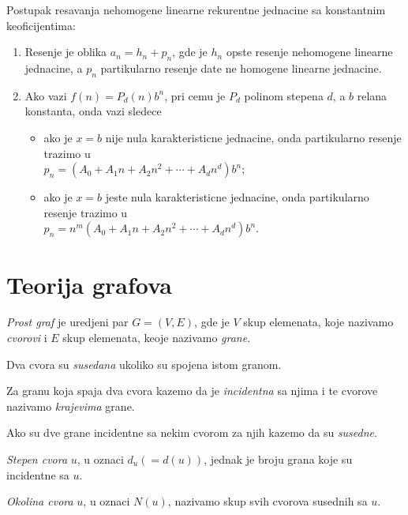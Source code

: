 \documentclass[12p, a4paper]{article}
\begin{document}
\begin{multicols}{2}
    Postupak resavanja nehomogene linearne rekurentne jednacine sa konstantnim
    keoficijentima:

    \begin{enumerate}
        \itemsep0em
        \item Resenje je oblika $a_n = h_n + p_n$, gde je $h_n$ opste resenje
            nehomogene linearne jednacine, a $p_n$ partikularno resenje date
            ne homogene linearne jednacine.
        \item Ako vazi $f(n) = P_d(n) b^n$, pri cemu je $P_d$ polinom stepena
            $d$, a $b$ relana konstanta, onda vazi sledece
        \begin{itemize}
            \itemsep0em
            \item ako je $x = b$ nije nula karakteristicne jednacine, onda
                partikularno resenje trazimo u \\
                $p_n = (A_0 + A_1 n + A_2 n^2 + \cdots + A_d n^d) b^n$;
            \item ako je $x = b$ jeste nula karakteristicne jednacine, onda
                partikularno resenje trazimo u \\
                $p_n = n^m(A_0 + A_1 n + A_2 n^2 + \cdots + A_d n^d) b^n$.
        \end{itemize}
    \end{enumerate}

    \section{Teorija grafova}

    \emph{Prost graf} je uredjeni par $G = (V, E)$, gde je $V$ skup elemenata,
    koje nazivamo \emph{cvorovi} i $E$ skup elemenata, keoje nazivamo 
    \emph{grane}.

    Dva cvora su \emph{susedana} ukoliko su spojena istom granom.

    Za granu koja spaja dva cvora kazemo da je \emph{incidentna} sa njima
    i te cvorove nazivamo \emph{krajevima} grane.

    Ako su dve grane incidentne sa nekim cvorom za njih kazemo da su
    \emph{susedne}.

    \emph{Stepen cvora} $u$, u oznaci $d_u ( = d(u))$, jednak je broju
    grana koje su incidentne sa $u$.

    \emph{Okolina cvora} $u$, u oznaci $N(u)$, nazivamo skup svih cvorova 
    susednih sa $u$.


\end{multicols}
\end{document}
